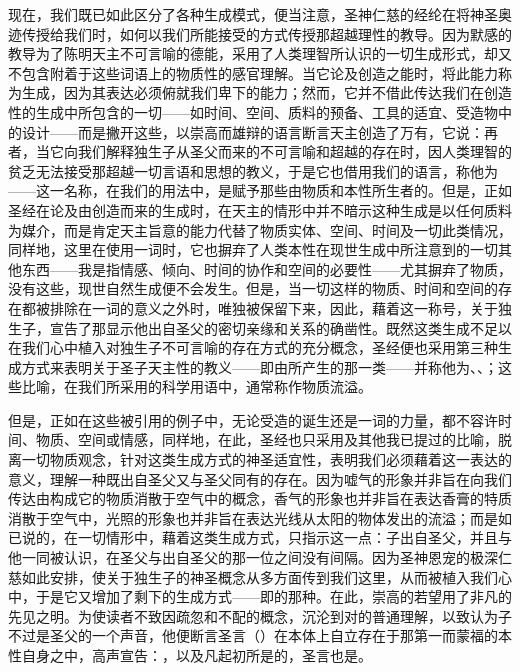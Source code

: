 现在，我们既已如此区分了各种生成模式，便当注意，圣神仁慈的经纶在将神圣奥迹传授给我们时，如何以我们所能接受的方式传授那超越理性的教导。因为默感的教导为了陈明天主不可言喻的德能，采用了人类理智所认识的一切生成形式，却又不包含附着于这些词语上的物质性的感官理解。当它论及创造之能时，将此能力称为生成，因为其表达必须俯就我们卑下的能力；然而，它并不借此传达我们在创造性的生成中所包含的一切——如时间、空间、质料的预备、工具的适宜、受造物中的设计——而是撇开这些，以崇高而雄辩的语言断言天主创造了万有，它说：再者，当它向我们解释独生子从圣父而来的不可言喻和超越的存在时，因人类理智的贫乏无法接受那超越一切言语和思想的教义，于是它也借用我们的语言，称他为——这一名称，在我们的用法中，是赋予那些由物质和本性所生者的。但是，正如圣经在论及由创造而来的生成时，在天主的情形中并不暗示这种生成是以任何质料为媒介，而是肯定天主旨意的能力代替了物质实体、空间、时间及一切此类情况，同样地，这里在使用一词时，它也摒弃了人类本性在现世生成中所注意到的一切其他东西——我是指情感、倾向、时间的协作和空间的必要性——尤其摒弃了物质，没有这些，现世自然生成便不会发生。但是，当一切这样的物质、时间和空间的存在都被排除在一词的意义之外时，唯独被保留下来，因此，藉着这一称号，关于独生子，宣告了那显示他出自圣父的密切亲缘和关系的确凿性。既然这类生成不足以在我们心中植入对独生子不可言喻的存在方式的充分概念，圣经便也采用第三种生成方式来表明关于圣子天主性的教义——即由所产生的那一类——并称他为、、；这些比喻，在我们所采用的科学用语中，通常称作物质流溢。\par

但是，正如在这些被引用的例子中，无论受造的诞生还是一词的力量，都不容许时间、物质、空间或情感，同样地，在此，圣经也只采用及其他我已提过的比喻，脱离一切物质观念，针对这类生成方式的神圣适宜性，表明我们必须藉着这一表达的意义，理解一种既出自圣父又与圣父同有的存在。因为嘘气的形象并非旨在向我们传达由构成它的物质消散于空气中的概念，香气的形象也并非旨在表达香膏的特质消散于空气中，光照的形象也并非旨在表达光线从太阳的物体发出的流溢；而是如已说的，在一切情形中，藉着这类生成方式，只指示这一点：子出自圣父，并且与他一同被认识，在圣父与出自圣父的那一位之间没有间隔。因为圣神恩宠的极深仁慈如此安排，使关于独生子的神圣概念从多方面传到我们这里，从而被植入我们心中，于是它又增加了剩下的生成方式——即的那种。在此，崇高的若望用了非凡的先见之明。为使读者不致因疏忽和不配的概念，沉沦到对的普通理解，以致认为子不过是圣父的一个声音，他便断言圣言（）在本体上自立存在于那第一而蒙福的本性自身之中，高声宣告：，以及凡起初所是的，圣言也是。\par

